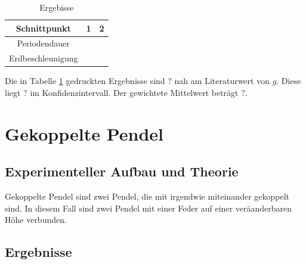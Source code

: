 \documentclass[11pt, a4paper]{article}
\begin{document}
    \begin{table}
        \centering
        \begin{tabular}{c|c|c}
            Schnittpunkt & 1 & 2 \\ \hline
            Periodendauer & & \\ \hline
            Erdbeschleunigung & &
        \end{tabular}
        \caption{Ergebisse}
        \label{ergrev}
    \end{table}

    Die in Tabelle \ref{ergrev} gedruckten Ergebnisse sind ? nah am Literaturwert von $g$. Diese liegt ?
    im Konfidenzintervall. Der gewichtete Mittelwert beträgt ?.

    \section{Gekoppelte Pendel}

    \subsection{Experimenteller Aufbau und Theorie}

    Gekoppelte Pendel sind zwei Pendel, die mit irgendwie miteinander gekoppelt sind. In diesem Fall sind
    zwei Pendel mit einer Feder auf einer veräanderbaren Höhe verbunden. 

    \subsection{Ergebnisse}

    
    
\end{document}
